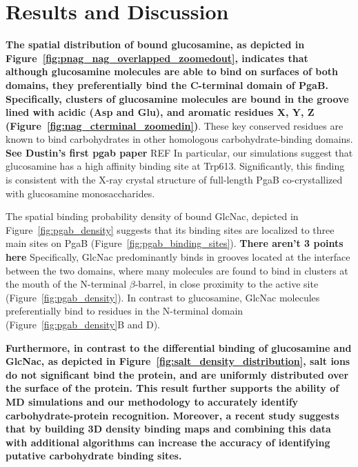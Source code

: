 \section{Results and Discussion}

\textbf{The spatial distribution of bound glucosamine, as depicted in Figure~\ref{fig:pnag_nag_overlapped_zoomedout}, indicates that although glucosamine molecules are able to bind on surfaces of both domains, they preferentially bind the C-terminal domain of PgaB. Specifically, clusters of glucosamine molecules are bound in the groove lined with acidic (Asp and Glu), and aromatic residues X, Y, Z (Figure~\ref{fig:nag_cterminal_zoomedin})}.  These key conserved residues are known to bind carbohydrates in other homologous carbohydrate-binding domains. \textbf{See Dustin's first pgab paper} REF In particular, our simulations suggest that glucosamine has a high affinity binding site at Trp613. Significantly, this finding is consistent with the X-ray crystal structure of full-length PgaB co-crystallized with glucosamine monosaccharides.

The spatial binding probability density of bound GlcNac, depicted in Figure~\ref{fig:pgab_density} suggests that its binding sites are localized to three main sites on PgaB (Figure~\ref{fig:pgab_binding_sites}). \textbf{There aren't 3 points here} Specifically, GlcNac predominantly binds in grooves located at the interface between the two domains, where many molecules are found to bind in clusters at the mouth of the N-terminal $\beta$-barrel, in close proximity to the active site (Figure~\ref{fig:pgab_density}).  In contrast to glucosamine, GlcNac molecules preferentially bind to residues in the N-terminal domain (Figure~\ref{fig:pgab_density}B and D).  



\textbf{Furthermore, in contrast to the differential binding of glucosamine and GlcNac, as depicted in Figure~\ref{fig:salt_density_distribution}, salt ions do not significant bind the protein, and are uniformly distributed over the surface of the protein.   This result further supports the ability of MD simulations and our methodology to accurately identify carbohydrate-protein recognition. Moreover, a recent study suggests that by building 3D density binding maps and combining this data with additional algorithms can increase the accuracy of identifying putative carbohydrate binding sites.\cite{Tsai:2012bj}}

